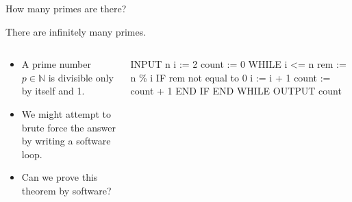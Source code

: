 \documentclass[,aspectratio=169]{beamer}
\newenvironment{Shaded}{\begin{snugshade}}{\end{snugshade}}
\newcommand{\NormalTok}[1]{#1}
\newcommand{\bbN}{\mathbb{N}}
\begin{document}
\begin{frame}[fragile,t]{How many primes are there?}
\protect\hypertarget{how-many-primes-are-there}{}
\pause

\begin{theorem}
There are infinitely many primes.
\end{theorem}

\begin{columns}[T]
\pause

\begin{column}{0.48\textwidth}
\begin{itemize}
\item
  A prime number \(p\in\bbN\) is divisible only by itself and 1.
\item
  We might attempt to brute force the answer by writing a software loop.
\item
  Can we prove this theorem by software?
\end{itemize}
\end{column}

\begin{column}{0.48\textwidth}
\vspace{-1em}
\pause

\begin{Shaded}
\begin{Highlighting}[]
\NormalTok{INPUT n}
\NormalTok{  i := 2}
\NormalTok{  count := 0}
\NormalTok{  WHILE i \textless{}= n}
\NormalTok{    rem := n \% i}
\NormalTok{    IF rem not equal to 0}
\NormalTok{      i := i + 1}
\NormalTok{      count := count + 1}
\NormalTok{    END IF}
\NormalTok{  END WHILE}
\NormalTok{OUTPUT count}
\end{Highlighting}
\end{Shaded}
\end{column}
\end{columns}
\end{frame}
\end{document}
